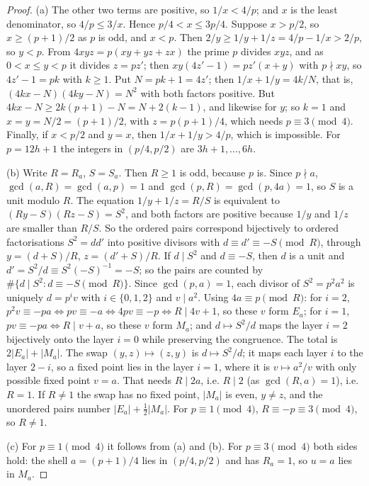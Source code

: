 \begin{proof}
(a) The other two terms are positive, so $1/x<4/p$; and $x$ is the least denominator, so $4/p\le3/x$. Hence $p/4<x\le3p/4$.
Suppose $x>p/2$, so $x\ge(p+1)/2$ as $p$ is odd, and $x<p$. Then $2/y\ge1/y+1/z=4/p-1/x>2/p$, so $y<p$. From $4xyz=p(xy+yz+zx)$ the prime $p$ divides $xyz$, and as $0<x\le y<p$ it divides $z=pz'$; then $xy(4z'-1)=pz'(x+y)$ with $p\nmid xy$, so $4z'-1=pk$ with $k\ge1$. Put $N=pk+1=4z'$; then $1/x+1/y=4k/N$, that is, $(4kx-N)(4ky-N)=N^2$ with both factors positive. But $4kx-N\ge2k(p+1)-N=N+2(k-1)$, and likewise for $y$; so $k=1$ and $x=y=N/2=(p+1)/2$, with $z=p(p+1)/4$, which needs $p\equiv3\pmod4$. Finally, if $x<p/2$ and $y=x$, then $1/x+1/y>4/p$, which is impossible. For $p=12h+1$ the integers in $(p/4,p/2)$ are $3h+1,\dots,6h$.

(b) Write $R=R_a$, $S=S_a$. Then $R\ge1$ is odd, because $p$ is. Since $p\nmid a$, $\gcd(a,R)=\gcd(a,p)=1$ and $\gcd(p,R)=\gcd(p,4a)=1$, so $S$ is a unit modulo $R$.
The equation $1/y+1/z=R/S$ is equivalent to $(Ry-S)(Rz-S)=S^2$, and both factors are positive because $1/y$ and $1/z$ are smaller than $R/S$. So the ordered pairs correspond bijectively to ordered factorisations $S^2=dd'$ into positive divisors with $d\equiv d'\equiv-S\pmod R$, through $y=(d+S)/R$, $z=(d'+S)/R$. If $d\mid S^2$ and $d\equiv-S$, then $d$ is a unit and $d'=S^2/d\equiv S^2(-S)^{-1}=-S$; so the pairs are counted by $\#\{d\mid S^2: d\equiv-S\pmod R\}$.
Since $\gcd(p,a)=1$, each divisor of $S^2=p^2a^2$ is uniquely $d=p^iv$ with $i\in\{0,1,2\}$ and $v\mid a^2$. Using $4a\equiv p\pmod R$:
for $i=2$, $p^2v\equiv-pa\iff pv\equiv-a\iff 4pv\equiv-p\iff R\mid 4v+1$, so these $v$ form $E_a$;
for $i=1$, $pv\equiv-pa\iff R\mid v+a$, so these $v$ form $M_a$;
and $d\mapsto S^2/d$ maps the layer $i=2$ bijectively onto the layer $i=0$ while preserving the congruence. The total is $2|E_a|+|M_a|$.
The swap $(y,z)\mapsto(z,y)$ is $d\mapsto S^2/d$; it maps each layer $i$ to the layer $2-i$, so a fixed point lies in the layer $i=1$, where it is $v\mapsto a^2/v$ with only possible fixed point $v=a$. That needs $R\mid 2a$, i.e. $R\mid2$ (as $\gcd(R,a)=1$), i.e. $R=1$. If $R\ne1$ the swap has no fixed point, $|M_a|$ is even, $y\ne z$, and the unordered pairs number $|E_a|+\tfrac12|M_a|$. For $p\equiv1\pmod4$, $R\equiv-p\equiv3\pmod4$, so $R\ne1$.

(c) For $p\equiv1\pmod4$ it follows from (a) and (b). For $p\equiv3\pmod4$ both sides hold: the shell $a=(p+1)/4$ lies in $(p/4,p/2)$ and has $R_a=1$, so $u=a$ lies in $M_a$.
\end{proof}

